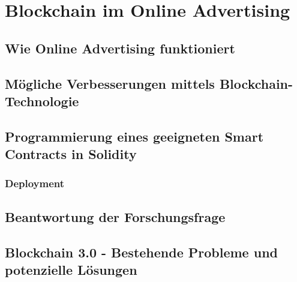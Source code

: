 \chapter{Blockchain im Online Advertising}
\section{Wie Online Advertising funktioniert}
\section{Mögliche Verbesserungen mittels Blockchain-Technologie}
\section{Programmierung eines geeigneten Smart Contracts in Solidity}
\subsection{Deployment}
\section{Beantwortung der Forschungsfrage}
\section{Blockchain 3.0 - Bestehende Probleme und potenzielle Lösungen}